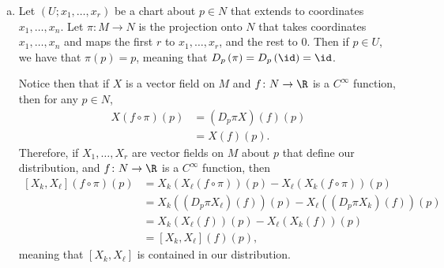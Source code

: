 \documentclass[10pt]{mypackage}
\begin{document}
\begin{solution}\hfill
  \begin{enumerate}[(a)]
    \item Let $\left( U;x_1,\dots,x_r \right)$ be a chart about $p\in N$ that extends to coordinates $x_1,\dots,x_n$. Let $\pi\colon M\rightarrow N$ is the projection onto $N$ that takes coordinates $x_1,\dots,x_n$ and maps the first $r$ to $x_1,\dots,x_r$, and the rest to $0$. Then if $p\in U$, we have that $\pi(p) = p$, meaning that $D_p\left( \pi \right) = D_p\left( \id \right) = \id$.\newline

      Notice then that if $X$ is a vector field on $M$ and $f\colon N\rightarrow \R$ is a $C^{\infty}$ function, then for any $p\in N$,
      \begin{align*}
        X\left( f\circ\pi \right)(p) &= \left( D_{p}\pi X \right)(f)(p)\\
                                     &= X(f)(p).
      \end{align*}
      Therefore, if $X_1,\dots,X_r$ are vector fields on $M$ about $p$ that define our distribution, and $f\colon N\rightarrow \R$ is a $C^{\infty}$ function, then
      \begin{align*}
        \left[ X_k,X_{\ell} \right]\left( f\circ\pi \right)(p) &= X_{k}\left( X_{\ell}(f\circ\pi) \right)(p) - X_{\ell}\left( X_k\left( f\circ\pi \right) \right)(p)\\
                                                               &= X_k\left( \left( D_{p}\pi X_{\ell} \right)(f) \right)(p) - X_{\ell}\left( \left( D_p\pi X_k \right)(f) \right)(p)\\
                                                               &= X_k\left( X_{\ell}\left( f \right) \right)(p) - X_{\ell}\left( X_k\left( f \right) \right)(p)\\
                                                               &= \left[ X_{k},X_{\ell} \right]\left( f \right)(p),
      \end{align*}
      meaning that $\left[ X_k,X_{\ell} \right]$ is contained in our distribution.
  \end{enumerate}
\end{solution}
\end{document}
